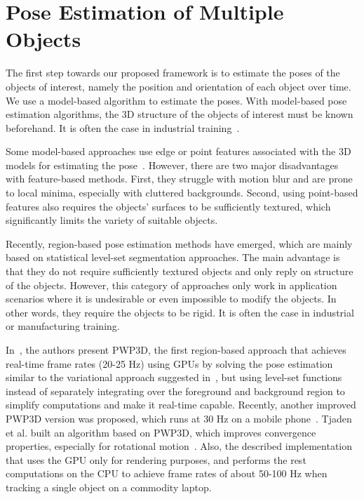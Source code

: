\section{Pose Estimation of Multiple Objects}
\label{sec:dm:pemo}

The first step towards our proposed framework is to estimate the poses of the objects of interest, namely the position and orientation of each object over time.
We use a model-based algorithm to estimate the poses.
With model-based pose estimation algorithms, the 3D structure of the objects of interest must be known beforehand. It is often the case in industrial training~\cite{cremers2007}.

Some model-based approaches use edge or point features associated with the 3D models for estimating the pose~\cite{harris1990,vacchetti2004,park2008,kim2010}.
However, there are two major disadvantages with feature-based methods.
First, they struggle with motion blur and are prone to local minima, especially with cluttered backgrounds.
Second, using point-based features also requires the objects' surfaces to be sufficiently textured, which significantly limits the variety of suitable objects.

Recently, region-based pose estimation methods have emerged, which are mainly based on statistical level-set segmentation approaches.
The main advantage is that they do not require sufficiently textured objects and only reply on structure of the objects.
However, this category of approaches only work in application scenarios where it is undesirable or even impossible to modify the objects. In other words, they require the objects to be rigid. It is often the case in industrial or manufacturing training.

In~\cite{prisacariu2012}, the authors present PWP3D, the first region-based  approach that achieves real-time frame rates (20-25 Hz) using GPUs by solving the pose estimation similar to the variational approach suggested in~\cite{dambreville2010}, but using level-set functions instead of separately integrating over the foreground and background region to simplify computations and make it real-time capable.
Recently, another improved PWP3D version was proposed, which runs at 30 Hz on a mobile phone~\cite{prisacariu2015}.
Tjaden et al. built an algorithm based on PWP3D, which improves convergence properties, especially for rotational motion~\cite{tjaden2016}. Also, the described implementation that uses the GPU only for rendering purposes, and performs the rest computations on the CPU to achieve frame rates of about 50-100 Hz when tracking a single object on a commodity laptop.

